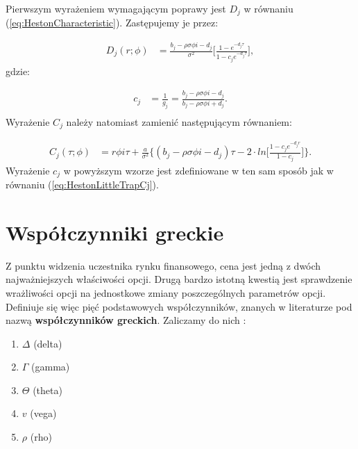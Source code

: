 \documentclass{pracamgr}
\begin{document}
Pierwszym wyrażeniem wymagającym poprawy jest $D_j$ w równaniu (\ref{eq:HestonCharacteristic}). 
Zastępujemy je przez:


\begin{equation}
\label{eq:HestonLittleTrapD}
  \begin{aligned}
D_j (r; \phi)  &= \frac{b_j- \rho \sigma \phi i - d_j}
                  {\sigma^2} \bigg[ \frac{1 - e^{-d_j \tau}}{1 - c_j e^{-d_j \tau}} \bigg],  
  \end{aligned}
\end{equation} 
gdzie:

\begin{equation}
\label{eq:HestonLittleTrapCj}
  \begin{aligned}
c_j  &= \frac{1}{g_j} = \frac{b_j - \rho \sigma \phi i - d_j}{b_j - \rho \sigma \phi i + d_j}. \\
  \end{aligned}
\end{equation}
Wyrażenie $C_j$ należy natomiast zamienić następującym równaniem:

\begin{equation}
\label{eq:HestonLittleTrapC}
  \begin{aligned}
C_j (\tau; \phi)     &= r \phi i \tau + \frac{a}{\sigma^2} 
                    \bigg\{ (b_j - \rho \sigma \phi i - d_j) \tau - 
                    2 \cdot ln \bigg[ \frac{1 - c_j e^{-d_j r}}{1-c_j} \bigg] \bigg\}.
  \end{aligned}
\end{equation}
Wyrażenie $c_j$ w powyższym wzorze jest zdefiniowane 
w ten sam sposób jak w równaniu (\ref{eq:HestonLittleTrapCj}).


\section{Współczynniki greckie}

Z punktu widzenia uczestnika rynku finansowego, cena jest jedną z dwóch najważniejszych 
właściwości opcji. Drugą bardzo istotną kwestią jest sprawdzenie wrażliwości opcji na jednostkowe 
zmiany poszczególnych parametrów opcji.
Definiuje się więc pięć podstawowych współczynników, znanych w literaturze pod 
nazwą \textbf{współczynników greckich}.
Zaliczamy do nich \cite{Hull}:
\begin{enumerate}
  \item $\Delta$ (delta)
  \item $\Gamma$ (gamma)
  \item $\Theta$ (theta)
  \item $v$ (vega)
  \item $\rho$ (rho)
\end{enumerate}
 
\end{document}
